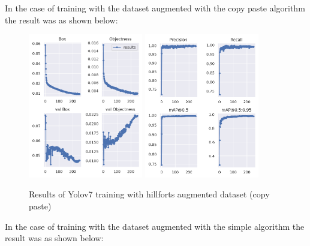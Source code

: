 In the case of training with the dataset augmented with the copy paste algorithm the result was as shown below:

\begin{figure}[H]
    \centering
    {{\includegraphics[width=5cm]{images/training/castros/aug1.png} }}
    \qquad
  {{\includegraphics[width=5cm]{images/training/castros/aug2.png} }}
    \caption{Results of Yolov7 training with hillforts augmented dataset (copy paste)}
    \label{fig:example}
\end{figure}

In the case of training with the dataset augmented with the simple algorithm the result was as shown below:

